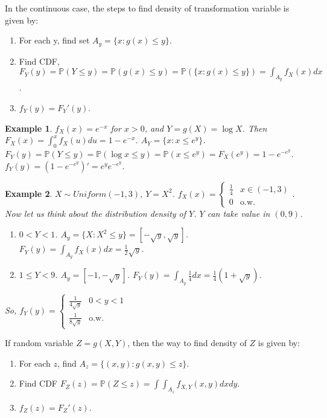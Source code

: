 \documentclass[11pt]{article}
\def\BP{{\bf P}}
\def\BP{{\mathbb P}}
\newtheorem{example}{Example}[section]
\begin{document}
In the continuous case, the steps to find density of transformation variable is given by:
\begin{enumerate}
\item For each y, find set $A_y = \{x:g(x) \leq y\}$.
\item Find CDF, $F_Y(y) = \BP(Y \leq y) = \BP(g(x) \leq y) = \BP(\{x: g(x)\leq y\}) = \int_{A_y} f_X(x) dx$.
\item $f_Y(y) = F_Y'(y)$.
\end{enumerate}

\begin{example}
  $f_X(x) = e^{-x}$ for $x>0$, and $Y=g(X)=\log X$. Then $F_X(x) = \int_0^x f_X(u) du = 1 - e^{-x}$. $A_Y = \{x: x \leq e^y\}$. $F_Y(y) = \BP(Y \leq y) = \BP(\log x \leq y) = \BP(x \leq e^y) = F_X(e^y) = 1 - e^{-e^y}$. $f_Y(y) = (1 - e^{-e^y})' = e^y e^{-e^y}$.
\end{example}

\begin{example}
  $X \sim Uniform(-1, 3)$, $Y=X^2$. $f_X(x) = \begin{cases}\frac{1}{4} & x\in(-1,3) \\ 0 & \text{o.w.}\end{cases}$. Now let us think about the distribution density of $Y$. $Y$ can take value in $(0, 9)$. 
  \begin{enumerate}
    \item $0 < Y < 1$. $A_y = \{X : X^2 \leq y\} = [-\sqrt{y}, \sqrt{y}]$. $F_Y(y) = \int_{A_y} f_X(x) dx = \frac{1}{2} \sqrt{y}$.
    \item $1 \leq Y < 9$. $A_y = [-1, -\sqrt{y}]$. $F_Y(y) = \int_{A_y} \frac{1}{4} dx = \frac{1}{4}(1 + \sqrt{y})$. 
  \end{enumerate}
  So, $f_Y(y) = \begin{cases} \frac{1}{4\sqrt{y}}  & 0 < y < 1 \\ \frac{1}{8\sqrt{y}}  & \text{o.w.}\end{cases}$
\end{example}

If random variable $Z = g(X, Y)$, then the way to find density of $Z$ is given by:
\begin{enumerate}
\item For each $z$, find $A_z = \{(x, y): g(x, y)\leq z\}$.
\item Find CDF $F_Z(z) = \BP(Z \leq z) = \int\int_{A_z} f_{X,Y}(x, y) dxdy$.
\item $f_Z(z) = F_Z'(z)$.
\end{enumerate}
\end{document}
